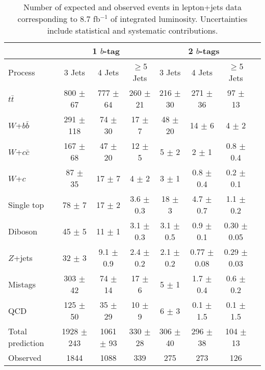 \documentclass[aps,prd,twocolumn,superscriptaddress,showpacs]{revtex4}
\begin{document}
\begin{table*}[tb] 
\begin{center} 
\caption{Number of expected and observed events in lepton+jets data corresponding to 8.7 fb$^{-1}$ of integrated luminosity. 
Uncertainties include statistical and systematic contributions.}
\label{table:m2calc}
\begin{tabularx}{0.95\textwidth}{l@{\; \; \; \; \; \; \; \; }c@{\; }c@{\;
}c@{\; \; \; \; \; \; }c@{\; }c@{\; }c@{\; }c}

\hline \hline
              &\multicolumn{3}{c}{{ 1 $b$-tag}}&\multicolumn{3}{c}{{ 2 $b$-tags}}\\ 
\hline
Process &\multicolumn{1}{c}{{3 Jets}}&\multicolumn{1}{c}{{4 
Jets}}&\multicolumn{1}{c}{{$\geq $5 Jets}} &\multicolumn{1}{c}{{3 Jets}}&\multicolumn{1}{c}{{4 Jets}}&\multicolumn{1}{c}{{$\geq $5 Jets}}\\ 
\hline 
$t\bar t$ &800 $\pm$ 67 & 777 $\pm$ 64 & 260 $\pm$ 21 & 216 $\pm$ 30 & 271 $\pm$ 36 & 97 $\pm$ 13 \\ 
$W$+$b\bar{b}$ &291 $\pm$ 118 & 74 $\pm$ 30 & 17 $\pm$ 7& 48 $\pm$ 20 & 14 $\pm$ 6 & 4 $\pm$ 2\\ 
$W$+$c\bar{c}$ &167 $\pm$ 68 &47 $\pm$ 20 & 12 $\pm$ 5 & 5 $\pm$ 2 & 2 $\pm$ 1 & 0.8 $\pm$ 0.4 \\ 
$W$+$c$ &87 $\pm$ 35 &17 $\pm$ 7 & 4 $\pm$ 2 & 3 $\pm$ 1 & 0.8 $\pm$ 0.4 & 0.2 $\pm$ 0.1 \\ 
Single top &78 $\pm$ 7 & 17 $\pm$ 2 & 3.6 $\pm$ 0.3 & 18 $\pm$ 3 & 4.7 $\pm$ 0.7 & 1.1 $\pm$ 0.2\\
Diboson & 45 $\pm$ 5 & 11 $\pm$ 1 & 3.1 $\pm$ 0.3 & 3.1 $\pm$ 0.5 & 0.9 $\pm$ 0.1 & 0.30 $\pm$ 0.05 \\
$Z$+jets &32 $\pm$ 3 & 9.1 $\pm$ 0.9 & 2.4 $\pm$ 0.2 & 2.1 $\pm$ 0.2 & 0.77 $\pm$ 0.08 & 0.29 $\pm$ 0.03 \\
Mistags &303 $\pm$ 42 & 74 $\pm$ 14 & 17 $\pm$ 6 & 5 $\pm$ 1 & 1.7 $\pm$ 0.4 & 0.6 $\pm$ 0.2 \\ 
QCD &125 $\pm$ 50 & 35 $\pm$ 29 & 10 $\pm$ 9 & 6 $\pm$ 3 & 0.1 $\pm$ 1.5 & 0.1 $\pm$ 1.5 \\ \hline
Total prediction&1928 $\pm$ 243 & 1061 $\pm$ 93 & 330 $\pm$ 28 & 306 $\pm$ 40 & 296 $\pm$ 38 & 104 $\pm$ 13\\ 
Observed &1844 &1088 &339 & 275 & 273 & 126 \\ 
\hline \hline
\end{tabularx} 
\end{center} 
\end{table*}
\end{document}
